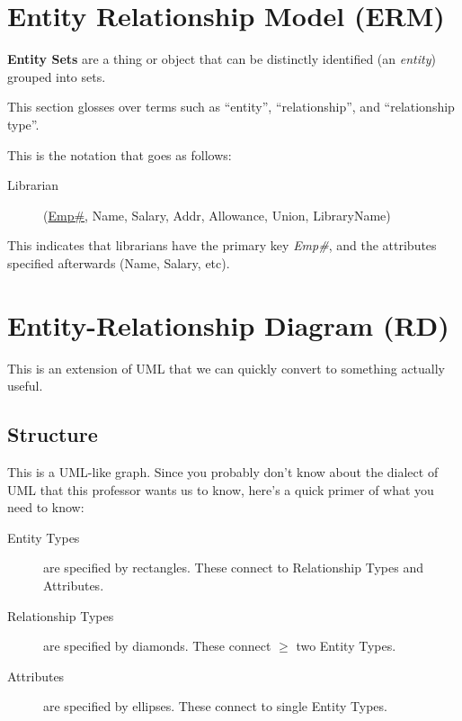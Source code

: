            \section{Entity Relationship Model (ERM)} %
            \label{sec:entity_relationship_model}
                \textbf{Entity Sets} are a thing or object that can be distinctly identified (an \textit{entity}) grouped into sets.

                This section glosses over terms such as ``entity'', ``relationship'', and ``relationship type''.

                This is the notation that goes as follows:
                \begin{description}
                    \item[Librarian] (\uline{Emp\#}, Name, Salary, Addr, Allowance, Union, LibraryName)
                \end{description}
                This indicates that librarians have the primary key \textit{Emp\#}, and the attributes specified afterwards (Name, Salary, etc).
            \section{Entity-Relationship Diagram (RD)} %
            \label{sec:entity_relationship_diagram_}
                This is an extension of UML that we can quickly convert to something actually useful.

                \subsection{Structure} %
                \label{sub:structure}
                    This is a UML-like graph.
                    Since you probably don't know about the dialect of UML that this professor wants us to know, here's a quick primer of what you need to know:
                    \begin{description}
                        \item[Entity Types] are specified by rectangles.
                        These connect to Relationship Types and Attributes.
                        \item[Relationship Types] are specified by diamonds.
                        These connect $\ge$ two Entity Types.
                        \item[Attributes] are specified by ellipses.
                        These connect to single Entity Types.
                    \end{description}
